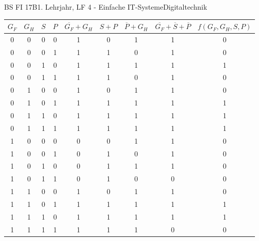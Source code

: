 \documentclass[oneside,openany,headings=optiontotoc,11pt,numbers=noenddot]{scrreprt}
\begin{document}
	\begin{worksheet}{BS FI 17B}{1. Lehrjahr, LF 4 - Einfache IT-Systeme}{Digitaltechnik}
		\begin{framed}
			\begin{tabularx}{\textwidth}{c|c|c|c|c|c|c|c|c}
				\(G_F\) & \(G_H\) & \(S\) & \(P\) & \(\overline{G_F} + G_H\) & \(S + P\) & \(\overline{P} + G_H\) & \(\overline{G_F} + \overline{S} + \overline{P}\) & \(f(G_F,G_H,S,P)\)\\
				\hline
				0 & 0 & 0 & 0 & 1 & 0 & 1 & 1 & 0\\
				0 & 0 & 0 & 1 & 1 & 1 & 0 & 1 & 0\\
				0 & 0 & 1 & 0 & 1 & 1 & 1 & 1 & 1\\
				0 & 0 & 1 & 1 & 1 & 1 & 0 & 1 & 0\\
				0 & 1 & 0 & 0 & 1 & 0 & 1 & 1 & 0\\
				0 & 1 & 0 & 1 & 1 & 1 & 1 & 1 & 1\\
				0 & 1 & 1 & 0 & 1 & 1 & 1 & 1 & 1\\
				0 & 1 & 1 & 1 & 1 & 1 & 1 & 1 & 1\\
				1 & 0 & 0 & 0 & 0 & 0 & 1 & 1 & 0\\
				1 & 0 & 0 & 1 & 0 & 1 & 0 & 1 & 0\\
				1 & 0 & 1 & 0 & 0 & 1 & 1 & 1 & 0\\
				1 & 0 & 1 & 1 & 0 & 1 & 0 & 0 & 0\\
				1 & 1 & 0 & 0 & 1 & 0 & 1 & 1 & 0\\
				1 & 1 & 0 & 1 & 1 & 1 & 1 & 1 & 1\\
				1 & 1 & 1 & 0 & 1 & 1 & 1 & 1 & 1\\
				1 & 1 & 1 & 1 & 1 & 1 & 1 & 0 & 0
			\end{tabularx}
		\end{framed}
	\end{worksheet}
\end{document}
